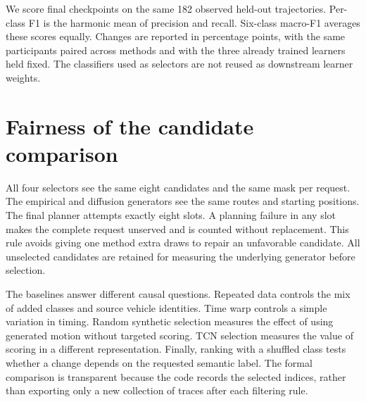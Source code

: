 We score final checkpoints on the same 182 observed held-out trajectories. Per-class F1 is the harmonic mean of precision and recall. Six-class macro-F1 averages these scores equally. Changes are reported in percentage points, with the same participants paired across methods and with the three already trained learners held fixed. The classifiers used as selectors are not reused as downstream learner weights.

\section{Fairness of the candidate comparison}
All four selectors see the same eight candidates and the same mask per request. The empirical and diffusion generators see the same routes and starting positions. The final planner attempts exactly eight slots. A planning failure in any slot makes the complete request unserved and is counted without replacement. This rule avoids giving one method extra draws to repair an unfavorable candidate. All unselected candidates are retained for measuring the underlying generator before selection.

The baselines answer different causal questions. Repeated data controls the mix of added classes and source vehicle identities. Time warp controls a simple variation in timing. Random synthetic selection measures the effect of using generated motion without targeted scoring. TCN selection measures the value of scoring in a different representation. Finally, ranking with a shuffled class tests whether a change depends on the requested semantic label. The formal comparison is transparent because the code records the selected indices, rather than exporting only a new collection of traces after each filtering rule.
